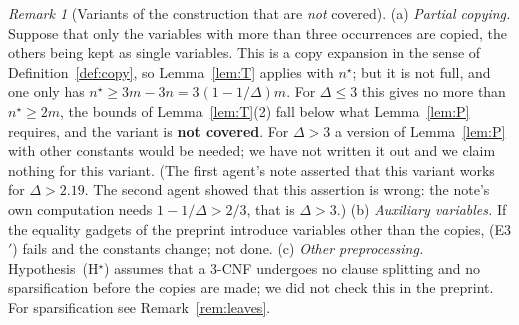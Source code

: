 \documentclass[11pt,a4paper]{article}
\theoremstyle{definition}
\theoremstyle{remark}
\newtheorem{remark}[theorem]{Remark}
\begin{document}
\begin{remark}[Variants of the construction that are \emph{not} covered]\label{rem:variants}
\textup{(a)} \emph{Partial copying.} Suppose that only the variables with more than three
occurrences are copied, the others being kept as single variables. This is a copy expansion
in the sense of Definition~\ref{def:copy}, so Lemma~\ref{lem:T} applies with $n^\star$; but
it is not full, and one only has $n^\star\ge3m-3n=3(1-1/\Delta)m$. For $\Delta\le3$ this
gives no more than $n^\star\ge2m$, the bounds of Lemma~\ref{lem:T}(2) fall below what
Lemma~\ref{lem:P} requires, and the variant is \textbf{not covered}. For $\Delta>3$ a
version of Lemma~\ref{lem:P} with other constants would be needed; we have not written it
out and we claim nothing for this variant. (The first agent's note asserted that this
variant works for $\Delta>2.19$. The second agent showed that this assertion is wrong: the
note's own computation needs $1-1/\Delta>2/3$, that is $\Delta>3$.)
\textup{(b)} \emph{Auxiliary variables.} If the equality gadgets of the preprint introduce
variables other than the copies, (E3$'$) fails and the constants change; not done.
\textup{(c)} \emph{Other preprocessing.} Hypothesis~(H$^\star$) assumes that a 3-CNF
undergoes no clause splitting and no sparsification before the copies are made; we did not
check this in the preprint. For sparsification see Remark~\ref{rem:leaves}.
\end{remark}
\end{document}
